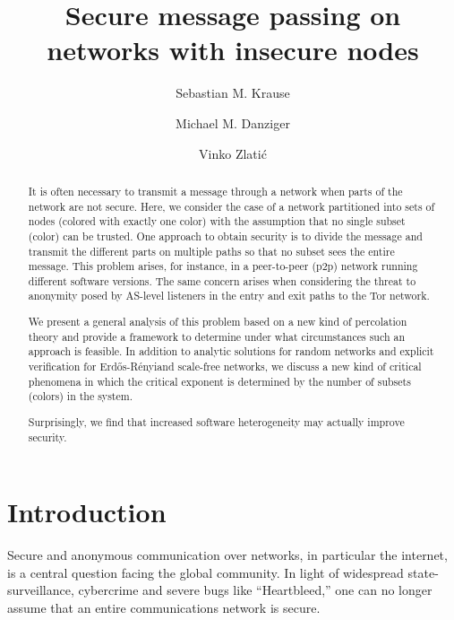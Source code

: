 \documentclass[aps, pre, twocolumn, a4paper, superscriptaddress, floatfix]{revtex4}
\newcommand{\er}{Erd\H{o}s-R\'{e}nyi}
\begin{document}
\title{Secure message passing on networks with insecure nodes}

\author{Sebastian M. Krause}
\author{Michael M. Danziger}
\author{Vinko Zlati\'{c}}
\begin{abstract}
It is often necessary to transmit a message through a network when parts of the network are not secure.
Here, we consider the case of a network partitioned into sets of nodes (colored with exactly one color) with the assumption that no single subset (color) can be trusted.
One approach to obtain security is to divide the message and transmit the different parts on multiple paths so that no subset sees the entire message.
This problem arises, for instance, in a peer-to-peer (p2p) network running different software versions.
The same concern arises when considering the threat to anonymity posed by AS-level listeners in the entry and exit paths to the Tor network.

We present a general analysis of this problem based on a new kind of percolation theory and provide a framework to determine under what circumstances such an approach is feasible.
In addition to analytic solutions for random networks and explicit verification for \er and scale-free networks, 
we discuss a new kind of critical phenomena in which the critical exponent is determined by the number of subsets (colors) in the system.

Surprisingly, we find that increased software heterogeneity may actually improve security.
\end{abstract}
\maketitle


\section{Introduction}

Secure and anonymous communication over networks, in particular the internet, is a central question facing the global community.
In light of widespread state-surveillance, cybercrime and severe bugs like ``Heartbleed,'' one can no longer assume that an entire communications network is secure.
\end{document}
